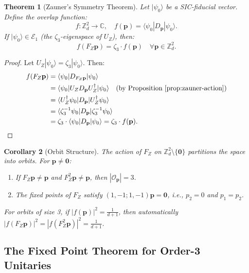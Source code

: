 \documentclass[a4paper,11pt]{article}
\newtheorem{theorem}{Theorem}[section]
\newtheorem{corollary}[theorem]{Corollary}
\newcommand{\C}{\mathbb{C}}
\newcommand{\Z}{\mathbb{Z}}
\begin{document}
\begin{theorem}[Zauner's Symmetry Theorem]\label{thm:zauner-symmetry}
Let $|\psi_0\rangle$ be a SIC-fiducial vector. Define the overlap function:
\begin{equation}
f: \Z_d^2 \to \C, \quad f(\mathbf{p}) = \langle\psi_0|D_\mathbf{p}|\psi_0\rangle.
\end{equation}
If $|\psi_0\rangle \in \mathcal{E}_1$ (the $\zeta_3$-eigenspace of $U_Z$), then:
\begin{equation}
f(F_Z \mathbf{p}) = \zeta_3 \cdot f(\mathbf{p}) \quad \forall \mathbf{p} \in \Z_d^2.
\end{equation}
\end{theorem}

\begin{proof}
Let $U_Z|\psi_0\rangle = \zeta_3|\psi_0\rangle$. Then:
\begin{align}
f(F_Z \mathbf{p}) &= \langle\psi_0|D_{F_Z\mathbf{p}}|\psi_0\rangle \\
&= \langle\psi_0|U_Z D_\mathbf{p} U_Z^\dagger|\psi_0\rangle \quad \text{(by Proposition \ref{prop:zauner-action})} \\
&= \langle U_Z^\dagger \psi_0|D_\mathbf{p}|U_Z^\dagger \psi_0\rangle \\
&= \langle \zeta_3^{-1}\psi_0|D_\mathbf{p}|\zeta_3^{-1}\psi_0\rangle \\
&= \zeta_3 \cdot \langle\psi_0|D_\mathbf{p}|\psi_0\rangle = \zeta_3 \cdot f(\mathbf{p}).
\end{align}
\end{proof}

\begin{corollary}[Orbit Structure]
The action of $F_Z$ on $\Z_d^2 \setminus \{\mathbf{0}\}$ partitions the space into orbits. For $\mathbf{p} \neq \mathbf{0}$:
\begin{enumerate}[label=(\roman*)]
    \item If $F_Z \mathbf{p} \neq \mathbf{p}$ and $F_Z^2 \mathbf{p} \neq \mathbf{p}$, then $|\mathcal{O}_\mathbf{p}| = 3$.
    \item The fixed points of $F_Z$ satisfy $(1, -1; 1, -1)\mathbf{p} = \mathbf{0}$, i.e., $p_2 = 0$ and $p_1 = p_2$.
\end{enumerate}
For orbits of size 3, if $|f(\mathbf{p})|^2 = \frac{1}{d+1}$, then automatically $|f(F_Z\mathbf{p})|^2 = |f(F_Z^2\mathbf{p})|^2 = \frac{1}{d+1}$.
\end{corollary}

\subsection{The Fixed Point Theorem for Order-3 Unitaries}
\end{document}
